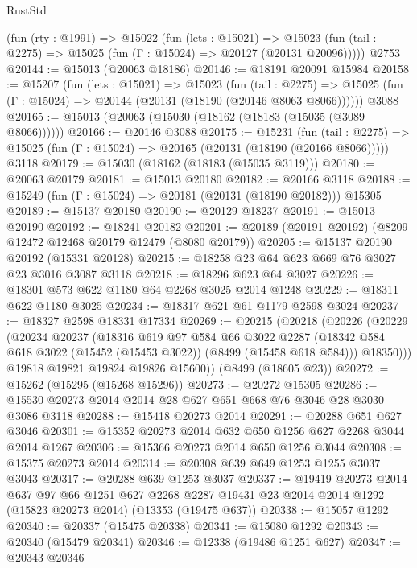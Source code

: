 \begin{lexlean}{RustStd}
\begin{coremodule}
    (fun (rty : @1991) =>
    @15022
      (fun (lets : @15021) =>
      @15023 (fun (tail : @2275) => @15025 (fun (Γ : @15024) => @20127 (@20131 @20096)))))
    @2753
@20144 := @15013 (@20063 @18186)
@20146 := @18191 @20091 @15984
@20158 := @15207
    (fun (lets : @15021) =>
    @15023
      (fun (tail : @2275) =>
      @15025 (fun (Γ : @15024) => @20144 (@20131 (@18190 (@20146 @8063 @8066))))))
    @3088
@20165 := @15013 (@20063 (@15030 (@18162 (@18183 (@15035 (@3089 @8066))))))
@20166 := @20146 @3088
@20175 := @15231
    (fun (tail : @2275) => @15025 (fun (Γ : @15024) => @20165 (@20131 (@18190 (@20166 @8066)))))
    @3118
@20179 := @15030 (@18162 (@18183 (@15035 @3119)))
@20180 := @20063 @20179
@20181 := @15013 @20180
@20182 := @20166 @3118
@20188 := @15249 (fun (Γ : @15024) => @20181 (@20131 (@18190 @20182))) @15305
@20189 := @15137 @20180
@20190 := @20129 @18237
@20191 := @15013 @20190
@20192 := @18241 @20182
@20201 := @20189 (@20191 @20192) (@8209 @12472 @12468 @20179 @12479 (@8080 @20179))
@20205 := @15137 @20190 @20192 (@15331 @20128)
@20215 := @18258 @23 @64 @623 @669 @76 @3027 @23 @3016 @3087 @3118
@20218 := @18296 @623 @64 @3027
@20226 := @18301 @573 @622 @1180 @64 @2268 @3025 @2014 @1248
@20229 := @18311 @622 @1180 @3025
@20234 := @18317 @621 @61 @1179 @2598 @3024
@20237 := @18327 @2598 @18331 @17334
@20269 := @20215
    (@20218
      (@20226
        (@20229
          (@20234
            @20237
            (@18316
              @619
              @97
              @584
              @66
              @3022
              @2287
              (@18342 @584 @618 @3022 (@15452 (@15453 @3022)) (@8499 (@15458 @618 @584)))
              @18350)))
        @19818
        @19821
        @19824
        @19826
        @15600))
    (@8499 (@18605 @23))
@20272 := @15262 (@15295 (@15268 @15296))
@20273 := @20272 @15305
@20286 := @15530 @20273 @2014 @2014 @28 @627 @651 @668 @76 @3046 @28 @3030 @3086 @3118
@20288 := @15418 @20273 @2014
@20291 := @20288 @651 @627 @3046
@20301 := @15352 @20273 @2014 @632 @650 @1256 @627 @2268 @3044 @2014 @1267
@20306 := @15366 @20273 @2014 @650 @1256 @3044
@20308 := @15375 @20273 @2014
@20314 := @20308 @639 @649 @1253 @1255 @3037 @3043
@20317 := @20288 @639 @1253 @3037
@20337 := @19419
    @20273
    @2014
    @637
    @97
    @66
    @1251
    @627
    @2268
    @2287
    @19431
    @23
    @2014
    @2014
    @1292
    (@15823 @20273 @2014)
    (@13353 (@19475 @637))
@20338 := @15057 @1292
@20340 := @20337 (@15475 @20338)
@20341 := @15080 @1292
@20343 := @20340 (@15479 @20341)
@20346 := @12338 (@19486 @1251 @627)
@20347 := @20343 @20346

\end{coremodule}
\end{lexlean}
